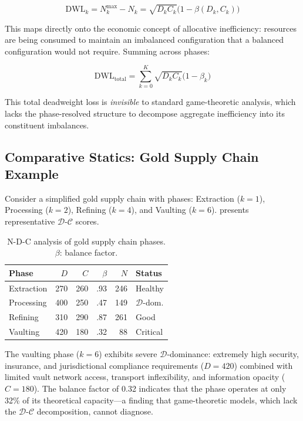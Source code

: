 \documentclass[12pt,a4paper,twocolumn]{article}
\newcommand{\D}{\mathcal{D}}
\newcommand{\CC}{\mathcal{C}}
\begin{document}
\begin{equation}
\label{eq:dwl}
\mathrm{DWL}_k = N_k^{\max} - N_k = \sqrt{D_k C_k}\bigl(1 - \beta(D_k, C_k)\bigr)
\end{equation}

This maps directly onto the economic concept of allocative inefficiency: resources are being consumed to maintain an imbalanced configuration that a balanced configuration would not require.
Summing across phases:

\begin{equation}
\mathrm{DWL}_{\mathrm{total}} = \sum_{k=0}^{K} \sqrt{D_k C_k}\bigl(1 - \beta_k\bigr)
\end{equation}

This total deadweight loss is \emph{invisible} to standard game-theoretic analysis, which lacks the phase-resolved structure to decompose aggregate inefficiency into its constituent imbalances.

\subsection{Comparative Statics: Gold Supply Chain Example}

Consider a simplified gold supply chain with phases: Extraction ($k=1$), Processing ($k=2$), Refining ($k=4$), and Vaulting ($k=6$).
 presents representative $\D$-$\CC$ scores.

\begin{table}[ht]
\centering
\scriptsize
\caption{N-D-C analysis of gold supply chain phases. $\beta$: balance factor.}
\label{tab:gold_ndc}
\begin{tabular}{@{}lrrrrl@{}}
\toprule
\textbf{Phase} & $D$ & $C$ & $\beta$ & $N$ & \textbf{Status} \\
\midrule
Extraction & 270 & 260 & .93 & 246 & Healthy \\
Processing & 400 & 250 & .47 & 149 & $\D$-dom. \\
Refining   & 310 & 290 & .87 & 261 & Good \\
Vaulting   & 420 & 180 & .32 &  88 & Critical \\
\bottomrule
\end{tabular}
\end{table}

The vaulting phase ($k=6$) exhibits severe $\D$-dominance: extremely high security, insurance, and jurisdictional compliance requirements ($D = 420$) combined with limited vault network access, transport inflexibility, and information opacity ($C = 180$).
The balance factor of 0.32 indicates that the phase operates at only 32\% of its theoretical capacity---a finding that game-theoretic models, which lack the $\D$-$\CC$ decomposition, cannot diagnose.
\end{document}
